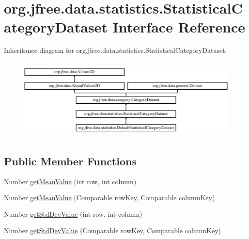 \hypertarget{interfaceorg_1_1jfree_1_1data_1_1statistics_1_1_statistical_category_dataset}{}\section{org.\+jfree.\+data.\+statistics.\+Statistical\+Category\+Dataset Interface Reference}
\label{interfaceorg_1_1jfree_1_1data_1_1statistics_1_1_statistical_category_dataset}
Inheritance diagram for org.\+jfree.\+data.\+statistics.\+Statistical\+Category\+Dataset\+:\begin{figure}[H]
\begin{center}
\leavevmode
\includegraphics[height=4.129793cm]{interfaceorg_1_1jfree_1_1data_1_1statistics_1_1_statistical_category_dataset}
\end{center}
\end{figure}
\subsection*{Public Member Functions}
\begin{DoxyCompactItemize}
\item 
Number \mbox{\hyperlink{interfaceorg_1_1jfree_1_1data_1_1statistics_1_1_statistical_category_dataset_ad09fbb6d9b82afd58a0be6a55d62bee8}{get\+Mean\+Value}} (int row, int column)
\item 
Number \mbox{\hyperlink{interfaceorg_1_1jfree_1_1data_1_1statistics_1_1_statistical_category_dataset_a8f486f51f975cc13e728180bbbc7314a}{get\+Mean\+Value}} (Comparable row\+Key, Comparable column\+Key)
\item 
Number \mbox{\hyperlink{interfaceorg_1_1jfree_1_1data_1_1statistics_1_1_statistical_category_dataset_a27682763862b22edca584d16439d08de}{get\+Std\+Dev\+Value}} (int row, int column)
\item 
Number \mbox{\hyperlink{interfaceorg_1_1jfree_1_1data_1_1statistics_1_1_statistical_category_dataset_abb476b69f5b495b75da4230921005878}{get\+Std\+Dev\+Value}} (Comparable row\+Key, Comparable column\+Key)
\end{DoxyCompactItemize}


